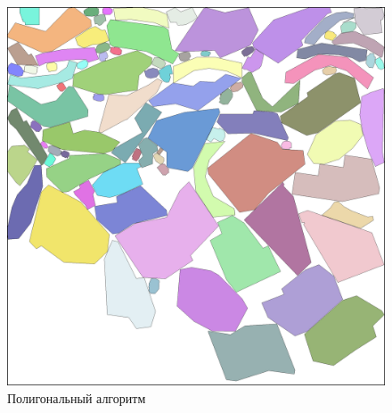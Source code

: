 \documentclass{fefu_thesis/cls/fefu}
\begin{document}
    \begin{figure}[H]
        \centering
        \includegraphics[scale=0.1]{images/polygonal.png}
        \caption{Полигональный алгоритм}
    \end{figure}
\end{document}
